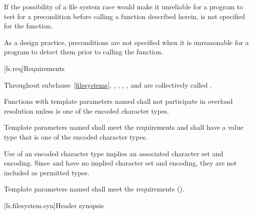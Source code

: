 \pnum
If the possibility of a file system race would make it unreliable for a
program to test for a precondition before calling a function described herein,
{}\expects is not specified for the function.
\begin{note}
As a design practice, preconditions are not specified when it
is unreasonable for a program to detect them prior to calling the function.
\end{note}

[fs.req]{Requirements}

\pnum
Throughout subclause~\ref{filesystems}, , , ,
, and  are collectively called
.

\pnum
Functions with template parameters named 
shall not participate in overload resolution
unless  is one of the encoded character types.

\pnum
Template parameters named  shall meet the
 requirements and shall
have a value type that is one of the encoded character types.

\pnum
\begin{note}
Use of an encoded character type implies an associated
character set and encoding.
Since  and  have no
implied character set and encoding,
they are not included as permitted types.
\end{note}

\pnum
Template parameters named  shall meet the
 requirements ().

[fs.filesystem.syn]{Header  synopsis}

